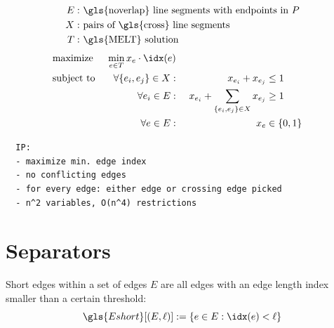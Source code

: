 
\begin{problem}
  \hfill
  \begin{alignat*}{1}
    E: &~ \text{\gls{noverlap} line segments with endpoints in \(P\)} \\
    X: &~ \text{pairs of \gls{cross} line segments} \\
    T: &~ \text{\gls{MELT} solution}
  \end{alignat*}
  \begin{alignat*}{3}
    &\text{maximize } & \min\limits_{e \in T} x_e \cdot \idx(e) \\
    &\text{subject to } & \forall \{e_i,e_j\} \in X : &~& x_{e_i} + x_{e_j} &\leq 1 \\
    && \forall e_i \in E : &~
      & x_{e_i} + \sum\limits_{\{e_i, e_j\} \in X} x_{e_j} &\geq 1 \\
    && \forall e \in E : &~& x_e &\in \{0,1\}
  \end{alignat*}
\end{problem}

\begin{verbatim}
  IP:
  - maximize min. edge index
  - no conflicting edges
  - for every edge: either edge or crossing edge picked
  - n^2 variables, O(n^4) restrictions
\end{verbatim}

\section{Separators}


\begin{definition}
  \label{def:short_edges}
  Short edges within a set of edges \(E\) are all edges with an
  edge length index smaller than a certain threshold:
  \[
    \gls{Eshort}[(E, \ell)] := \{ e \in E : \idx(e) < \ell \}
  \]
\end{definition}



